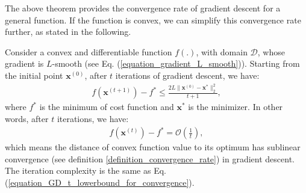 \documentclass[lang=cn,10pt]{gorgeousnbook}
\numberwithin{equation}{section}%
\numberwithin{figure}{section}%
\begin{document}
The above theorem provides the convergence rate of gradient descent for a general function. If the function is convex, we can simplify this convergence rate further, as stated in the following. 

\begin{theorem}\label{theorem_GD_convergence_rate_convexFunction}
Consider a convex and differentiable function $f(.)$, with domain $\mathcal{D}$, whose gradient is $L$-smooth (see Eq. (\ref{equation_gradient_L_smooth})).
Starting from the initial point $\boldsymbol{x}^{(0)}$, after $t$ iterations of gradient descent, we have:
\begin{align}\label{equation_GD_upperbound_min_norm_gradient_convexFunction}
f(\boldsymbol{x}^{(t+1)}) - f^* \leq \frac{2 L \|\boldsymbol{x}^{(0)} - \boldsymbol{x}^*\|_2^2}{t+1},
\end{align}
where $f^*$ is the minimum of cost function and $\boldsymbol{x}^*$ is the minimizer. In other words, after $t$ iterations, we have:
\begin{align}\label{equation_GD_norm_gradient_sublinear_rate_convexFunction}
f(\boldsymbol{x}^{(t)}) - f^* = \mathcal{O}(\frac{1}{t}),
\end{align}
which means the distance of convex function value to its optimum has sublinear convergence (see definition \ref{definition_convergence_rate}) in gradient descent. 
The iteration complexity is the same as Eq. (\ref{equation_GD_t_lowerbound_for_convergence}).
\end{theorem}
\end{document}
